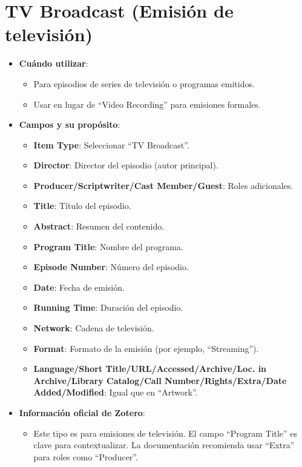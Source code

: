 \documentclass[
  jou,
  floatsintext,
  longtable,
  a4paper,
  nolmodern,
  notxfonts,
  notimes,
  12pt,
  colorlinks=true,linkcolor=blue,citecolor=blue,urlcolor=blue]{apa7}
\providecommand{\tightlist}{%
  \setlength{\itemsep}{0pt}\setlength{\parskip}{0pt}}
\begin{document}
\section{TV Broadcast (Emisión de
televisión)}\label{tv-broadcast-emisiuxf3n-de-televisiuxf3n}

\begin{itemize}
\tightlist
\item
  \textbf{Cuándo utilizar}:

  \begin{itemize}
  \tightlist
  \item
    Para episodios de series de televisión o programas emitidos.
  \item
    Usar en lugar de ``Video Recording'' para emisiones formales.
  \end{itemize}
\item
  \textbf{Campos y su propósito}:

  \begin{itemize}
  \tightlist
  \item
    \textbf{Item Type}: Seleccionar ``TV Broadcast''.
  \item
    \textbf{Director}: Director del episodio (autor principal).
  \item
    \textbf{Producer/Scriptwriter/Cast Member/Guest}: Roles adicionales.
  \item
    \textbf{Title}: Título del episodio.
  \item
    \textbf{Abstract}: Resumen del contenido.
  \item
    \textbf{Program Title}: Nombre del programa.
  \item
    \textbf{Episode Number}: Número del episodio.
  \item
    \textbf{Date}: Fecha de emisión.
  \item
    \textbf{Running Time}: Duración del episodio.
  \item
    \textbf{Network}: Cadena de televisión.
  \item
    \textbf{Format}: Formato de la emisión (por ejemplo, ``Streaming'').
  \item
    \textbf{Language/Short Title/URL/Accessed/Archive/Loc. in
    Archive/Library Catalog/Call Number/Rights/Extra/Date
    Added/Modified}: Igual que en ``Artwork''.
  \end{itemize}
\item
  \textbf{Información oficial de Zotero}:

  \begin{itemize}
  \tightlist
  \item
    Este tipo es para emisiones de televisión. El campo ``Program
    Title'' es clave para contextualizar. La documentación recomienda
    usar ``Extra'' para roles como ``Producer''.
  \end{itemize}
\end{itemize}
\end{document}
